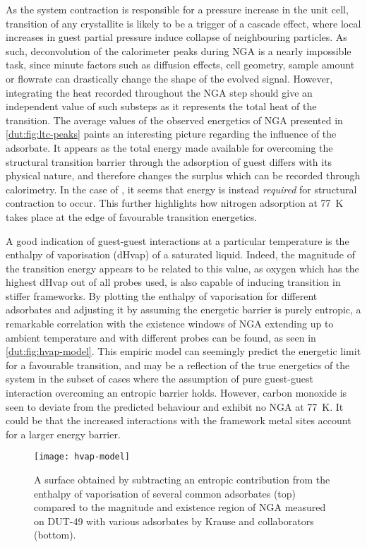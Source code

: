 As the system contraction is responsible for a pressure increase
in the unit cell, transition of any crystallite is likely to be a
trigger of a cascade effect, where local increases in guest partial 
pressure induce collapse of neighbouring particles. As such,
deconvolution of the calorimeter peaks during \gls{NGA} is a nearly 
impossible task, since minute factors such as diffusion effects,
cell geometry, sample amount or flowrate can drastically change 
the shape of the evolved signal. However, integrating the heat 
recorded throughout the \gls{NGA} step should give an independent value of such
substeps as it represents the total heat of the transition. 
The average values of the observed energetics of 
\gls{NGA} presented in \autoref{dut:fig:ltc-peaks} paints an interesting
picture regarding the influence of the adsorbate.
It appears as the total energy made available 
for overcoming the structural transition barrier
through the adsorption of guest differs with its physical
nature, and therefore changes the surplus which can be recorded
through calorimetry. In the case of , it seems that energy 
is instead \textit{required} for structural contraction to occur.
This further highlights how nitrogen adsorption at \SI{77}{\kelvin}
takes place at the edge of favourable transition energetics.

A good indication of guest-guest interactions at 
a particular temperature is the enthalpy of vaporisation 
(\gls{dHvap}) of a saturated liquid. Indeed, the magnitude
of the transition energy appears to be related to this value, as
oxygen which has the highest \gls{dHvap} out of all probes 
used, is also capable of inducing transition in stiffer frameworks. By
plotting the enthalpy of vaporisation for different adsorbates
and adjusting it by assuming the energetic barrier is purely 
entropic, a remarkable correlation with the existence windows
of \gls{NGA} extending up to ambient temperature and with different probes
can be found, as seen in \autoref{dut:fig:hvap-model}.
This empiric model can seemingly predict the energetic limit
for a favourable transition, and may be a reflection of the 
true energetics of the system in the subset of cases where the 
assumption of pure guest-guest interaction overcoming an entropic
barrier holds. However, carbon monoxide is seen to deviate from
the predicted behaviour and exhibit no \gls{NGA} at \SI{77}{\kelvin}. 
It could be that the increased interactions with the framework metal
sites account for a larger energy barrier.

\begin{figure}[htb]
    \centering
    \texttt{[image: hvap-model]}%
    \caption{
        A surface obtained by subtracting an entropic 
        contribution from the enthalpy of vaporisation of 
        several common adsorbates (top) compared to the 
        magnitude and existence region of \gls{NGA} measured on 
        DUT-49 with various adsorbates by Krause and 
        collaborators (bottom).
    }\label{dut:fig:hvap-model}
\end{figure}

